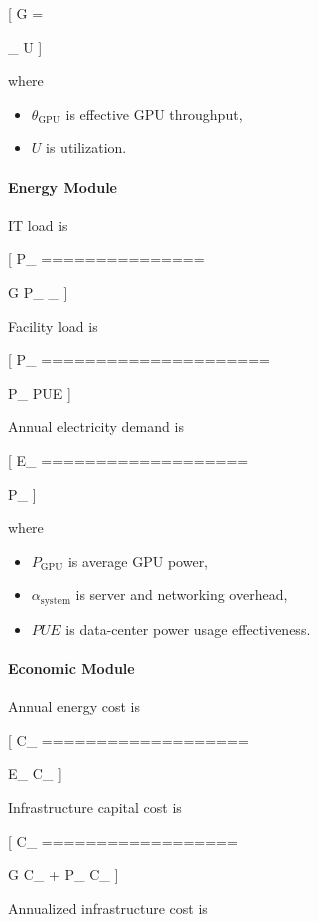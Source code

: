 [
G
=

{\theta_{} U}
]

where

\begin{itemize}
\item $\theta_{\mathrm{GPU}}$ is effective GPU throughput,
\item $U$ is utilization.
\end{itemize}

\paragraph{Energy Module}

IT load is

[
P_{}
===============

G
\cdot
P_{}
\cdot
\alpha_{}
]

Facility load is

[
P_{}
=====================

P_{}
\cdot
PUE
]

Annual electricity demand is

[
E_{}
===================

P_{}
]

where

\begin{itemize}
\item $P_{\mathrm{GPU}}$ is average GPU power,
\item $\alpha_{\mathrm{system}}$ is server and networking overhead,
\item $PUE$ is data-center power usage effectiveness.
\end{itemize}

\paragraph{Economic Module}

Annual energy cost is

[
C_{}
===================

E_{}
\cdot
C_{}
]

Infrastructure capital cost is

[
C_{}
==================

G
\cdot
C_{}
+
P_{}
\cdot
C_{}
]

Annualized infrastructure cost is

